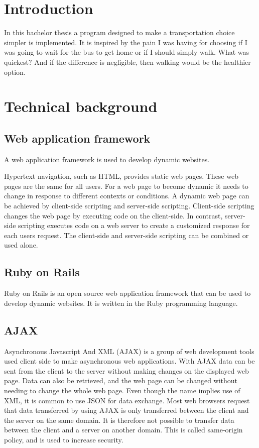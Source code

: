 \documentclass[10pt,a4paper]{article}
\begin{document}
\tableofcontents
\newpage
\section{Introduction}
In this bachelor thesis a program designed to make a transportation choice simpler is implemented. It is inspired by the pain I was having for choosing if I was going to wait for the bus to get home or if I should simply walk. What was quickest? And if the difference is negligible, then walking would be the healthier option.
\section{Technical background}
\subsection{Web application framework}
A web application framework is used to develop dynamic websites. 

Hypertext navigation, such as HTML, provides static web pages. These web pages are the same for all users. For a web page to become dynamic it needs to change in response to different contexts or conditions. A dynamic web page can be achieved by client-side scripting and server-side scripting. Client-side scripting changes the web page by executing code on the client-side. In contrast, server-side scripting executes code on a web server to create a customized response for each users request. The client-side and server-side scripting can be combined or used alone.

\subsection{Ruby on Rails}
Ruby on Rails is an open source web application framework that can be used to develop dynamic websites. It is written in the Ruby programming language. 

\subsection{AJAX}
Asynchronous Javascript And XML (AJAX) is a group of web development tools used client side to make asynchronous web applications. With AJAX data can be sent from the client to the server without making changes on the displayed web page. Data can also be retrieved, and the web page can be changed without needing to change the whole web page. Even though the name implies use of XML, it is common to use JSON for data exchange. Most web browsers request that data transferred by using AJAX is only transferred between the client and the server on the same domain. It is therefore not possible to transfer data between the client and a server on another domain. This is called same-origin policy, and is used to increase security.
\end{document}
